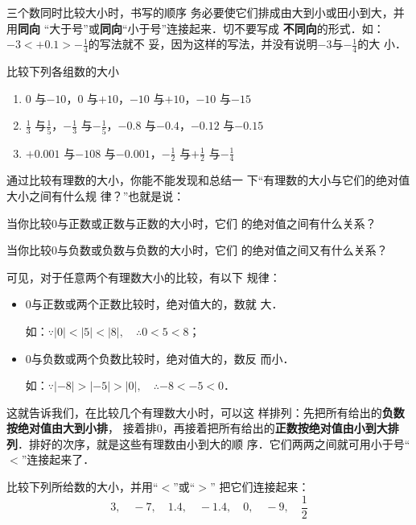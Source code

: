 \begin{rmk}
	三个数同时比较大小时，书写的顺序
	务必要使它们排成由大到小或田小到大，并用\textbf{同向}
	“大于号”或\textbf{同向}“小于号”连接起来．切不要写成
	\textbf{不同向}的形式．如：$-3<+0.1>-\frac{1}{4}$的写法就不
	妥，因为这样的写法，并没有说明$-3$与$-\frac{1}{4}$的大
	小．
\end{rmk}

\begin{ex}
	比较下列各组数的大小
	\begin{enumerate}
		\item $0$ 与$-10$，\quad $0$ 与$+10$，\quad $-10$ 与$+10$，\quad $-10$ 与$-15$
		\item $\frac{1}{3}$ 与$\frac{1}{5}$，\quad $-\frac{1}{3}$ 与$-\frac{1}{5}$，\quad $-0.8$ 与$-0.4$，\quad $-0.12$ 与$-0.15$
		\item $+0.001$ 与$-108$ 与$-0.001$，\quad $-\frac{1}{2}$ 与$+\frac{1}{2}$ 与$-\frac{1}{4}$
	\end{enumerate}
\end{ex}

通过比较有理数的大小，你能不能发现和总结一
下“有理数的大小与它们的绝对值大小之间有什么规
律？”也就是说：

当你比较0与正数或正数与正数的大小时，它们
的绝对值之间有什么关系？

当你比较0与负数或负数与负数的大小时，它们
的绝对值之间又有什么关系？

可见，对于任意两个有理数大小的比较，有以下
规律：
\begin{itemize}
	\item 0与正数或两个正数比较时，绝对值大的，数就
	大．
	
	如：$\because |0|<|5|<|8|, \quad \therefore 0<5<8$；
	\item 0与负数或两个负数比较时，绝对值大的，数反
	而小．
	
	如：$\because |-8|>|-5|>|0|, \quad \therefore -8<-5<0$．
\end{itemize}

这就告诉我们，在比较几个有理数大小时，可以这
样排列：先把所有给出的\textbf{负数按绝对值由大到小排}，
接着排0，再接着把所有给出的\textbf{正数按绝对值由小到大排
	列}．排好的次序，就是这些有理数由小到大的顺
序．它们两两之间就可用小于号“$<$”连接起来了．

\begin{example}
	比较下列所给数的大小，并用“$<$”或“$>$”
	把它们连接起来：   
	\[3,\quad -7,\quad 1.4,\quad -1.4,\quad 0,\quad -9,\quad \frac{1}{2} \]
\end{example}

